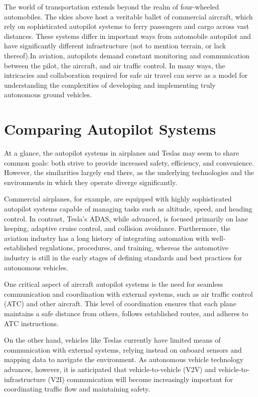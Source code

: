 The world of transportation extends beyond the realm of four-wheeled automobiles. The skies above host a veritable ballet of commercial aircraft, which rely on sophisticated autopilot systems to ferry passengers and cargo across vast distances. These systems differ in important ways from automobile autopilot and have significantly different infrastructure (not to mention terrain, or lack thereof).In aviation, autopilots demand constant monitoring and communication between the pilot, the aircraft, and air traffic control. In many ways, the intricacies and collaboration required for safe air travel can serve as a model for understanding the complexities of developing and implementing truly autonomous ground vehicles.

\section{Comparing Autopilot Systems}

At a glance, the autopilot systems in airplanes and Teslas may seem to share common goals: both strive to provide increased safety, efficiency, and convenience. However, the similarities largely end there, as the underlying technologies and the environments in which they operate diverge significantly.

Commercial airplanes, for example, are equipped with highly sophisticated autopilot systems capable of managing tasks such as altitude, speed, and heading control. In contrast, Tesla's ADAS, while advanced, is focused primarily on lane keeping, adaptive cruise control, and collision avoidance. Furthermore, the aviation industry has a long history of integrating automation with well-established regulations, procedures, and training, whereas the automotive industry is still in the early stages of defining standards and best practices for autonomous vehicles.

One critical aspect of aircraft autopilot systems is the need for seamless communication and coordination with external systems, such as air traffic control (ATC) and other aircraft. This level of coordination ensures that each plane maintains a safe distance from others, follows established routes, and adheres to ATC instructions.

On the other hand, vehicles like Teslas currently have limited means of communication with external systems, relying instead on onboard sensors and mapping data to navigate the environment. As autonomous vehicle technology advances, however, it is anticipated that vehicle-to-vehicle (V2V) and vehicle-to-infrastructure (V2I) communication will become increasingly important for coordinating traffic flow and maintaining safety.

